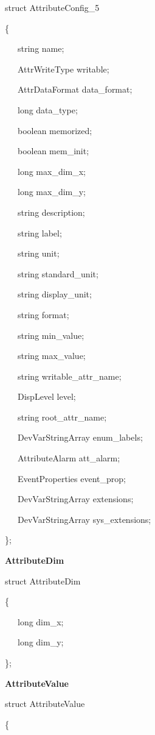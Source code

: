 struct AttributeConfig\_5

\{

~~~string name;

~~~AttrWriteType writable;

~~~AttrDataFormat data\_format;

~~~long data\_type;

~~~boolean memorized;

~~~boolean mem\_init;

~~~long max\_dim\_x;

~~~long max\_dim\_y;

~~~string description;

~~~string label;

~~~string unit;

~~~string standard\_unit;

~~~string display\_unit;

~~~string format;

~~~string min\_value;

~~~string max\_value;

~~~string writable\_attr\_name;

~~~DispLevel level;

~~~string root\_attr\_name;

~~~DevVarStringArray enum\_labels;

~~~AttributeAlarm att\_alarm;

~~~EventProperties event\_prop;

~~~DevVarStringArray extensions;

~~~DevVarStringArray sys\_extensions;

\};\\

\begin{flushleft}
\textbf{AttributeDim}
\par\end{flushleft}

struct AttributeDim

\{

~~~long dim\_x;

~~~long dim\_y;

\};\\

\begin{flushleft}
\textbf{AttributeValue}
\par\end{flushleft}

struct AttributeValue

\{

